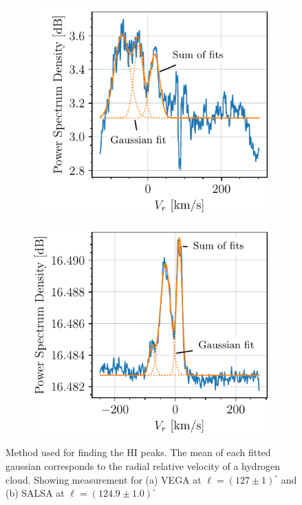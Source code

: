 \begin{figure}[htbp]
    \centering
    \begin{subfigure}{0.49\textwidth}
        \includegraphics{figures/VEGA2_fit_l_127.pdf}
        \caption{}
        \label{fig:fit_VEGA}
    \end{subfigure}
    \begin{subfigure}{0.49\textwidth}
        \includegraphics{figures/SALSA_fit_l_124.9.pdf}
        \caption{}
        \label{fig:fit_SALSA}
    \end{subfigure}
    \caption{Method used for finding the HI peaks. The mean of each fitted gaussian corresponds to the radial relative velocity of a hydrogen cloud. Showing measurement for (a) VEGA at $\ell = (127 \pm 1)^\circ$ and (b) SALSA at $\ell = (124.9 \pm 1.0)^\circ$}
    \label{fig:look_at_these_fits_please}
\end{figure}